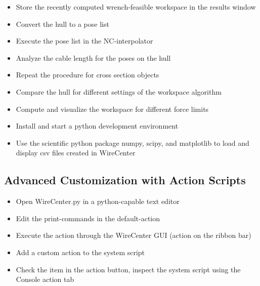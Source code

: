\begin{itemize}
\item  {Store the recently computed wrench-feasible workspace
  in the results
  window}
\item  {Convert the hull to a pose
  list}
\item  {Execute the pose list in the
  NC-interpolator}
\item  {Analyze the cable length for the poses on the
  hull}
\item  {Repeat the procedure for cross section
  objects}
\item  {Compare the hull for different settings of the
  workspace
  algorithm}
\item  {Compute and visualize the workspace for different force
  limits}
\end{itemize}

\begin{itemize}
\item  {Install and start a python
  development environment}
\item  {Use the scientific python package numpy, scipy, and
  matplotlib to load and display csv files created in
  WireCenter}
\end{itemize}

\subsection{Advanced Customization with Action
Scripts}

\begin{itemize}
\item  {Open WireCenter.py in a python-capable text
  editor}
\item  {Edit the print-commands in the
  default-action}
\item  {Execute the action through the WireCenter GUI (action
  on the ribbon
  bar)}
\item  {Add a custom action to the system
  script}
\item  {Check the item in the action button, inspect the system
  script using the Console action
  tab}
\end{itemize}



